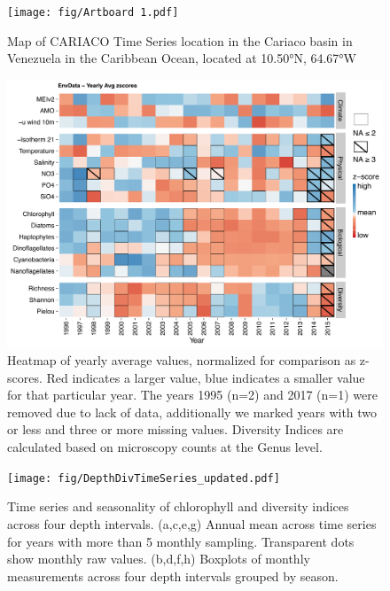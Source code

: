 \documentclass[draft]{agujournal2019}
\begin{document}
\begin{figure}
\noindent\texttt{[image: fig/Artboard 1.pdf]}
\caption{Map of CARIACO Time Series location in the Cariaco basin in Venezuela in the Caribbean Ocean, located at \ang{10.50}N, \ang{64.67}W}
\label{fig:map}
\end{figure}

\begin{figure}
\noindent\includegraphics[width=\textwidth]{fig/PLOTZScores_updated.pdf}
\caption{Heatmap of yearly average values, normalized for comparison as z-scores. Red indicates a larger value, blue indicates a smaller value for that particular year. The years 1995 (n=2) and 2017 (n=1) were removed due to lack of data, additionally we marked years with two or less and three or more missing values. Diversity Indices are calculated based on microscopy counts at the Genus level.}
\label{fig:zscore}
\end{figure}

\begin{figure}
\begin{center}
\noindent\texttt{[image: fig/DepthDivTimeSeries\_updated.pdf]}
\end{center}
\caption{Time series and seasonality of chlorophyll and diversity indices across four depth intervals. (a,c,e,g) Annual mean across time series for years with more than 5 monthly sampling. Transparent dots show monthly raw values. (b,d,f,h) Boxplots of monthly measurements across four depth intervals grouped by season.}
\label{fig:divts}
\end{figure}
\end{document}
